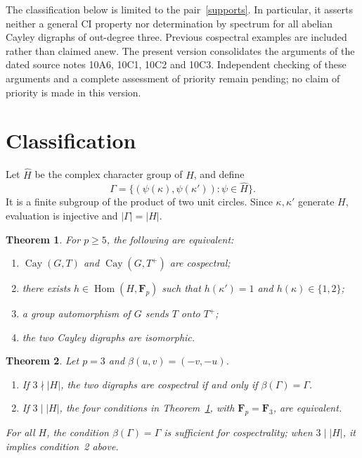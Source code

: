 \documentclass[11pt]{article}
\newtheorem{theorem}{Theorem}[section]
\theoremstyle{remark}\newtheorem{remark}[theorem]{Remark}
\newcommand{\Fp}{\mathbf F_p}
\newcommand{\Fthree}{\mathbf F_3}
\newcommand{\Cay}{\operatorname{Cay}}
\newcommand{\Hom}{\operatorname{Hom}}
\begin{document}
The classification below is limited to the pair~\eqref{supports}. In particular, it asserts neither a general CI property nor determination by spectrum for all abelian Cayley digraphs of out-degree three. Previous cospectral examples are included rather than claimed anew. The present version consolidates the arguments of the dated source notes 10A6, 10C1, 10C2 and 10C3. Independent checking of these arguments and a complete assessment of priority remain pending; no claim of priority is made in this version.

\section{Classification}
Let $\widehat H$ be the complex character group of $H$, and define
\begin{equation}\label{Gamma}
\Gamma=\{(\psi(\kappa),\psi(\kappa')):\psi\in\widehat H\}.
\end{equation}
It is a finite subgroup of the product of two unit circles. Since $\kappa,\kappa'$ generate $H$, evaluation is injective and $|\Gamma|=|H|$.

\begin{theorem}\label{main5}
For $p\geq5$, the following are equivalent:
\begin{enumerate}
\item $\Cay(G,T)$ and $\Cay(G,T^+)$ are cospectral;
\item there exists $h\in\Hom(H,\Fp)$ such that $h(\kappa')=1$ and $h(\kappa)\in\{1,2\}$;
\item a group automorphism of $G$ sends $T$ onto $T^+$;
\item the two Cayley digraphs are isomorphic.
\end{enumerate}
\end{theorem}

\begin{theorem}\label{main3}
Let $p=3$ and $\beta(u,v)=(-v,-u)$.
\begin{enumerate}
\item If $3\nmid|H|$, the two digraphs are cospectral if and only if $\beta(\Gamma)=\Gamma$.
\item If $3\mid|H|$, the four conditions in Theorem~\ref{main5}, with $\Fp=\Fthree$, are equivalent.
\end{enumerate}
For all $H$, the condition $\beta(\Gamma)=\Gamma$ is sufficient for cospectrality; when $3\mid|H|$, it implies condition~2 above.
\end{theorem}
\end{document}
